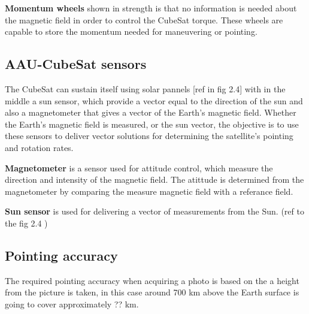 %
\textbf{Momentum wheels} shown in  strength is that no information is needed about the magnetic field in order to control the CubeSat torque. These wheels are capable to store the momentum needed for maneuvering or pointing.
%
\subsection{AAU-CubeSat sensors}
The CubeSat can sustain itself using solar pannels [ref in fig 2.4] with in the middle a sun sensor, which provide a vector equal to the direction of the sun and also a magnetometer that gives a vector of the Earth's magnetic field. Whether the Earth’s magnetic field is measured, or the sun vector, the objective is to use these sensors to deliver vector solutions for determining the satellite’s pointing and rotation rates.

\textbf{Magnetometer} is a sensor used for attitude control, which measure the direction and intensity of the magnetic field. The atittude is determined from the magnetometer by comparing the measure magnetic field with a referance field.

\textbf{Sun sensor} is used for delivering a vector of measurements from the Sun. (ref to the fig 2.4 )
%
\subsection{Pointing accuracy}
The required pointing accuracy when acquiring a photo is based on the a height from the picture is taken, in this case around 700 km above the Earth surface is going to cover approximately ?? km. 



